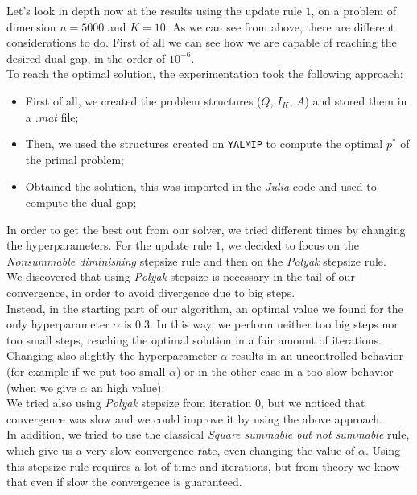 \documentclass[notitlepage]{article}
\begin{document}
\vspace{1em}

\begin{changemargin}{3.5cm}{3.5cm}
  Let's look in depth now at the results using the update rule $1$, on a problem of dimension $n=5000$ and $K=10$. As we can see from above, there are different considerations to do.
  First of all we can see how we are capable of reaching the desired dual gap, in the order of $10^{-6}$.\\
  To reach the optimal solution, the experimentation took the following approach:
  \begin{itemize}
    \item First of all, we created the problem structures ($Q$, $I_K$, $A$) and stored them in a \textit{.mat} file;
    \item Then, we used the structures created on \texttt{YALMIP} to compute the optimal $p^*$ of the primal problem;
    \item Obtained the solution, this was imported in the \textit{Julia} code and used to compute the dual gap;
  \end{itemize}
  In order to get the best out from our solver, we tried different times by changing the hyperparameters. For the update rule $1$, we decided to focus on the {\itshape Nonsummable diminishing} 
  stepsize rule and then on the {\itshape Polyak} stepsize rule.\\
  We discovered that using \textit{Polyak} stepsize is necessary in the tail of our convergence, in order to avoid divergence due to big steps.\\
  Instead, in the starting part of our algorithm, an optimal value we found for the only hyperparameter $\alpha$ is $0.3$. In this way, we perform neither too big steps nor too small steps, 
  reaching the optimal solution in a fair amount of iterations.\\
  Changing also slightly the hyperparameter $\alpha$ results in an uncontrolled behavior (for example if we put too small $\alpha$) or in the other case in a too slow behavior (when we give $\alpha$
  an high value).\\
  We tried also using \textit{Polyak} stepsize from iteration $0$, but we noticed that convergence was slow and we could improve it by using the above approach.\\
  In addition, we tried to use the classical {\itshape Square summable but not summable} rule, which give us a very slow convergence rate, even changing the value of $\alpha$. Using this stepsize 
  rule requires a lot of time and iterations, but from theory we know that even if slow the convergence is guaranteed.
\end{changemargin}
\end{document}
